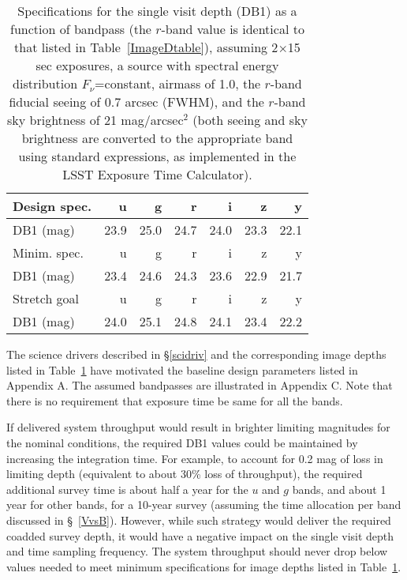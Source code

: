 \begin{table}[h]
\begin{tabular}{|l|r|r|r|r|r|r|}
\hline
 Design spec.  &       u   &     g    &      r     &   i   &   z   &  y   \\
\hline
 DB1 (mag)  &    23.9   &    25.0  &     24.7   &  24.0 &  23.3 & 22.1 \\
\hline
\hline
 Minim. spec.  &       u   &     g    &      r     &   i   &   z   &  y   \\
\hline
DB1 (mag)  &    23.4   &    24.6  &     24.3   &  23.6 &  22.9 & 21.7 \\
\hline
\hline
 Stretch goal  &       u   &     g    &      r     &   i   &   z   &  y   \\
\hline
 DB1 (mag)     &    24.0   &    25.1  &     24.8   &  24.1 &  23.4 & 22.2 \\
\hline
\end{tabular}
\caption{Specifications for the single visit depth (DB1) as a function
of bandpass (the $r$-band value is identical to that listed in
Table~\ref{ImageDtable}), assuming 2$\times$15 sec exposures,
a source with spectral energy distribution $F_\nu$=constant,
airmass of 1.0, the $r$-band fiducial seeing of 0.7 arcsec (FWHM), and
the $r$-band sky brightness of 21 mag/arcsec$^2$
(both seeing and sky brightness are converted to the appropriate band using standard
expressions, as implemented in the LSST Exposure Time
Calculator).}
\label{ImageDBtable}
\end{table}

The science drivers described in \S \ref{scidriv} and
the corresponding image depths listed in Table~\ref{ImageDBtable}
have motivated the baseline design parameters listed in Appendix A.
The assumed bandpasses are illustrated in Appendix C. Note that there is no
requirement that exposure time be same for all the bands.

If delivered system throughput would result in brighter limiting magnitudes
for the nominal conditions, the required DB1 values could be maintained by
increasing the integration time. For example, to account for 0.2 mag of loss
in limiting depth (equivalent to about 30\% loss of throughput), the required
additional survey time is about half a year for the $u$ and $g$ bands, and about
1 year for other bands, for a 10-year survey (assuming the time allocation per band
discussed in \S~\ref{VvsB}). However, while such strategy would deliver the
required coadded survey depth, it would have a negative impact on the single
visit depth and time sampling frequency. The system throughput should never
drop below values needed to meet minimum specifications for image depths
listed in Table~\ref{ImageDBtable}.

